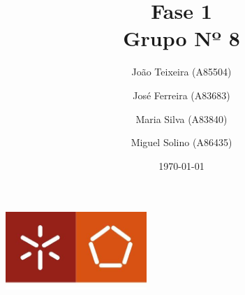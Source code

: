\documentclass[a4paper]{report}
\begin{document}
\title{Fase 1\\ 
\large Grupo Nº 8}
\author{João Teixeira (A85504) \and José Ferreira (A83683) \and Maria Silva (A83840) \and Miguel Solino (A86435)}

\date{\today}

\begin{center}
    \begin{minipage}{0.75\linewidth}
        \centering
        \includegraphics[width=0.4\textwidth]{images/eng.jpeg}\par\vspace{1cm}
        \vspace{1cm}
        \href{https://www.uminho.pt/PT}
        {\color{black}{\scshape\LARGE Universidade do Minho}} \par
        \vspace{1cm}
        \href{https://www.di.uminho.pt/}
        {\color{black}{\scshape\Large Departamento de Informática}} \par
        \maketitle
    \end{minipage}
\end{center}
\end{document}
